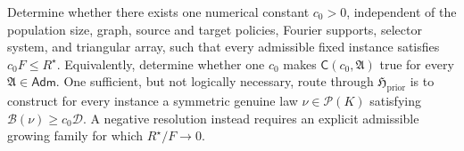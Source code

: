 Determine whether there exists one numerical constant \(c_0>0\), independent of the population size, graph, source and target policies, Fourier supports, selector system, and triangular array, such that every admissible fixed instance satisfies \(c_0F\le R^{\star}\). Equivalently, determine whether one \(c_0\) makes \(\mathsf C(c_0,\mathfrak A)\) true for every \(\mathfrak A\in\mathsf{Adm}\). One sufficient, but not logically necessary, route through \(\mathfrak H_{\mathrm{prior}}\) is to construct for every instance a symmetric genuine law \(\nu\in\mathcal P(K)\) satisfying \(\mathcal B(\nu)\ge c_0\mathcal D\). A negative resolution instead requires an explicit admissible growing family for which \(R^{\star}/F\to0\).